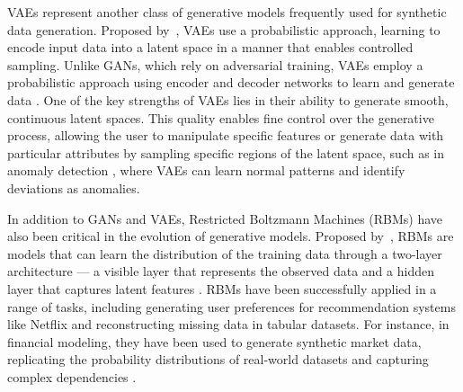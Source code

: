 \documentclass{article}
\begin{document}
VAEs represent another class of generative models frequently used for synthetic data generation. Proposed by~\textcite{kingma_auto-encoding_2022}, VAEs use a probabilistic approach, learning to encode input data into a latent space in a manner that enables controlled sampling. Unlike GANs, which rely on adversarial training, VAEs  employ a probabilistic approach using encoder and decoder networks to learn and generate data \parencite{lu_machine_2024}. One of the key strengths of VAEs lies in their ability to generate smooth, continuous latent spaces. This quality enables fine control over the generative process, allowing the user to manipulate specific features or generate data with particular attributes by sampling specific regions of the latent space, such as in anomaly detection \parencite{niu_lstm-based_2020}, where VAEs can learn normal patterns and identify deviations as anomalies.

In addition to GANs and VAEs, Restricted Boltzmann Machines (RBMs) have also been critical in the evolution of generative models. Proposed by~\textcite{salakhutdinov_restricted_2007}, RBMs are models that can learn the distribution of the training data through a two-layer architecture — a visible layer that represents the observed data and a hidden layer that captures latent features \parencite{carvajal-patino_synthetic_2022}. RBMs have been successfully applied in a range of tasks, including generating user preferences for recommendation systems like Netflix \parencite{nematholahy_recommender_2020} and reconstructing missing data in tabular datasets. For instance, in financial modeling, they have been used to generate synthetic market data, replicating the probability distributions of real-world datasets and capturing complex dependencies \parencite{kondratyev_market_2019}.
\end{document}
